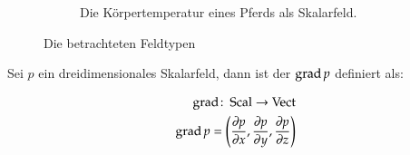 \begin{figure}
\begin{subfigure}[t]{0.5\textwidth}
		\caption{Die Körpertemperatur eines Pferds als Skalarfeld.}
\label{fig:mathematics_scalarfield}
	\end{subfigure}
	\caption{Die betrachteten Feldtypen}
\end{figure}

Sei $p$ ein dreidimensionales Skalarfeld, dann ist der 
$\operatorname*{grad} p$ definiert als:

\begin{equation}
\begin{aligned}
\operatorname*{grad} \colon \operatorname*{Scal} \to \operatorname*{Vect} \\
\operatorname*{grad} p
=
\left( \frac{\partial p}{\partial x},\frac{\partial p}{\partial y},\frac{\partial p}{\partial z} \right)
\end{aligned}
\end{equation}

